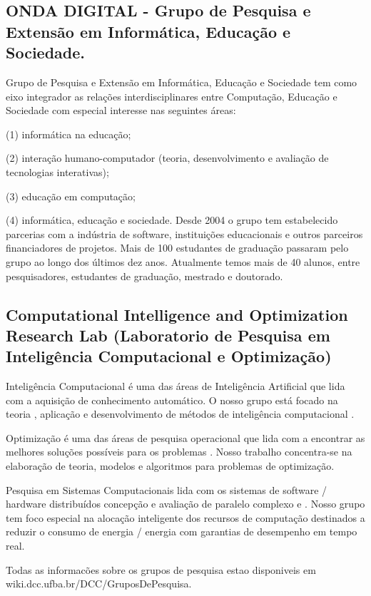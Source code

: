      \subsection{ONDA DIGITAL - Grupo de Pesquisa e Extensão em Informática, Educação e Sociedade.}
      Grupo de Pesquisa e Extensão em Informática, Educação e Sociedade tem como eixo integrador as relações interdisciplinares entre Computação, Educação e Sociedade com especial interesse nas seguintes áreas: 
      
      (1) informática na educação; 
      
      (2) interação humano-computador (teoria, desenvolvimento e avaliação de tecnologias interativas); 
      
      (3) educação em computação; 
      
      (4) informática, educação e sociedade. Desde 2004 o grupo tem estabelecido parcerias com a indústria de software, instituições educacionais e outros parceiros financiadores de projetos. Mais de 100 estudantes de graduação passaram pelo grupo ao longo dos últimos dez anos. Atualmente temos mais de 40 alunos, entre pesquisadores, estudantes de graduação, mestrado e doutorado.
     
      \subsection{Computational Intelligence and Optimization Research Lab
      (Laboratorio de Pesquisa em Inteligência Computacional e Optimização)}
     Inteligência Computacional é uma das áreas de Inteligência Artificial que lida com a aquisição de conhecimento automático. O nosso grupo está focado na teoria , aplicação e desenvolvimento de métodos de inteligência computacional .
	  
	  Optimização é uma das áreas de pesquisa operacional que lida com a encontrar as melhores soluções possíveis para os problemas . Nosso trabalho concentra-se na elaboração de teoria, modelos e algoritmos para problemas de optimização.
	  
	  Pesquisa em Sistemas Computacionais lida com os sistemas de software / hardware distribuídos concepção e avaliação de paralelo complexo e . Nosso grupo tem foco especial na alocação inteligente dos recursos de computação destinados a reduzir o consumo de energia / energia com garantias de desempenho em tempo real.
	  
      Todas as informacões sobre os grupos de pesquisa estao disponiveis em wiki.dcc.ufba.br/DCC/GruposDePesquisa.
    

